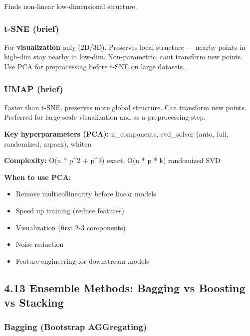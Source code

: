 \documentclass[11pt]{article}
\providecommand{\tightlist}{\setlength{\itemsep}{1pt}\setlength{\parskip}{0pt}}
\begin{document}
Finds non-linear low-dimensional structure.

\subsubsection{t-SNE (brief)}\label{t-sne-brief}

For \textbf{visualization} only (2D/3D). Preserves local structure --- nearby points in high-dim stay nearby in low-dim. Non-parametric, can\textquotesingle t transform new points. Use PCA for preprocessing before t-SNE on large datasets.

\subsubsection{UMAP (brief)}\label{umap-brief}

Faster than t-SNE, preserves more global structure. Can transform new points. Preferred for large-scale visualization and as a preprocessing step.

\textbf{Key hyperparameters (PCA):} n\_components, svd\_solver (auto, full, randomized, arpack), whiten

\textbf{Complexity:} O(n * p\^{}2 + p\^{}3) exact, O(n * p * k) randomized SVD

\textbf{When to use PCA:}

\begin{itemize}
\tightlist
\item
  Remove multicollinearity before linear models
\item
  Speed up training (reduce features)
\item
  Visualization (first 2-3 components)
\item
  Noise reduction
\item
  Feature engineering for downstream models
\end{itemize}

\subsection{4.13 Ensemble Methods: Bagging vs Boosting vs Stacking}\label{413-ensemble-methods-bagging-vs-boosting-vs-stacking}

\subsubsection{Bagging (Bootstrap AGGregating)}\label{bagging-bootstrap-aggregating}

\setcodelang{}
\end{document}
